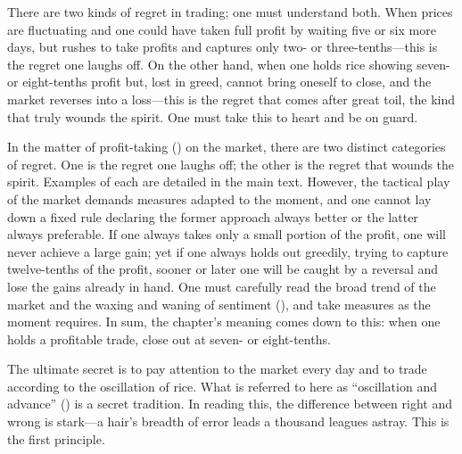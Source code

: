 
\begin{sokyubox}
{\small\itshape\color{sokyubar} }

\medskip
There are two kinds of regret in trading; one must understand both.
When prices are fluctuating and one could have taken full profit by
waiting five or six more days, but rushes to take profits and captures
only two- or three-tenths---this is the regret one laughs off. On the
other hand, when one holds rice showing seven- or eight-tenths profit
but, lost in greed, cannot bring oneself to close, and the market
reverses into a loss---this is the regret that comes after great toil,
the kind that truly wounds the spirit. One must take this to heart and
be on guard.
\end{sokyubox}

\commentary
In the matter of profit-taking () on the market, there
are two distinct categories of regret. One is the regret one laughs off;
the other is the regret that wounds the spirit. Examples of each are
detailed in the main text. However, the tactical play of the market
demands measures adapted to the moment, and one cannot lay down a fixed
rule declaring the former approach always better or the latter always
preferable. If one always takes only a small portion of the profit, one
will never achieve a large gain; yet if one always holds out greedily,
trying to capture twelve-tenths of the profit, sooner or later one will
be caught by a reversal and lose the gains already in hand. One must
carefully read the broad trend of the market and the waxing and waning
of sentiment (), and take measures as the moment
requires. In sum, the chapter's meaning comes down to this: when one
holds a profitable trade, close out at seven- or eight-tenths.


\begin{sokyubox}
{\small\itshape\color{sokyubar} }

\medskip
The ultimate secret is to pay attention to the market every day and to
trade according to the oscillation of rice. What is referred to here as
``oscillation and advance'' () is a secret
tradition. In reading this, the difference between right and wrong is
stark---a hair's breadth of error leads a thousand leagues astray. This
is the first principle.
\end{sokyubox}

